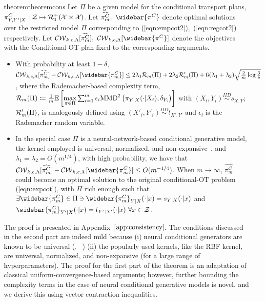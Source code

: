 \begin{theoremBox}
\begin{restatable}{theorem}{theoremcons}\label{thm1}
Let $\Pi$ be a given model for the conditional transport plans, $\pi^C_{Y,Y'|X}:\mathcal{Z}\mapsto\mathcal{R}_1^+(\mathcal{X}\times\mathcal{X})$. Let $\widehat{\pi^C_m}, ~\widebar{\pi^C}$ denote optimal solutions over the restricted model $\Pi$ corresponding to (\ref{eqn:empcot2}),\ (\ref{eqn:regcot2}) respectively. Let $\calCW[\widehat{\pi^C_m}],\ \calCW[\widebar{\pi^C}]$ denote the objectives with the Conditional-OT-plan fixed to the corresponding arguments.
\begin{itemize}
\item With probability at least $1-\delta$, $\calCW[\widehat{\pi^C_m}]-\calCW[\widebar{\pi^C_m}]\le2\lambda_1\calR_{m}(\Pi) +2\lambda_2\calR'_{m}(\Pi)+ 6(\lambda_1+\lambda_2)\sqrt{\frac{2}{m}\log{\frac{3}{\delta}}}$, where the Rademacher-based complexity term, $\mathcal{R}_{m}(\Pi)\coloneqq \frac{1}{m}\mathbb{E}\left[\max\limits_{\pi\in\Pi}\sum_{i=1}^m\epsilon_i\textup{MMD}^2\left(\pi_{Y|X}(\cdot|X_i), \delta_{Y_i}\right)\right]$ with $(X_i,Y_i)\stackrel{IID}{\sim} s_{X, Y}$; $\mathcal{R}'_{m}(\Pi)$, is analogously defined using $(X'_i,Y'_i)\stackrel{IID}{\sim} t_{X', Y'}$ and $\epsilon_i$ is the Rademacher random variable. 
\item In the special case $\Pi$ is a neural-network-based conditional generative model, the kernel employed is universal, normalized, and non-expansive~\citep{pmlr-v168-waarde22a}, and $\lambda_1=\lambda_2=O(m^{1/4})$, with high probability, we have that $\calCW[\widehat{\pi^C_m}]-\calCW[\widebar{\pi^C_m}]\le O(m^{-1/4})$. When $m\rightarrow\infty$, $\widehat{\pi^C_m}$ could become an optimal solution to the original conditional-OT problem (\ref{eqn:expcot}), with $\Pi$ rich enough such that $\exists\widebar{\pi^C_m}\in\Pi\ni\widebar{\pi^C_m}_{Y|X}(\cdot|x)=s_{Y|X}(\cdot|x)$ and $\widebar{\pi^C_m}_{Y'|X}(\cdot|x)=t_{Y'|X'}(\cdot|x) \ \forall x\in \calZ$.
\end{itemize}
\end{restatable}
\end{theoremBox}
The proof is presented in Appendix~$\ref{app:consistency}$. The conditions discussed in the second part are indeed mild because (i) neural conditional generators are known to be universal (\cite[Lemma (2.1)]{Liu2021WassersteinGL},
 ~\citep{pmlr-v125-kidger20a})
 (ii) the popularly used kernels, like the RBF kernel, are universal, normalized, and non-expansive (for a large range of hyperparameters). The proof for the first part of the theorem is an adaptation of classical uniform-convergence-based arguments; however, further bounding the complexity terms in the case of neural conditional generative models is novel, and we derive this using vector contraction inequalities.

